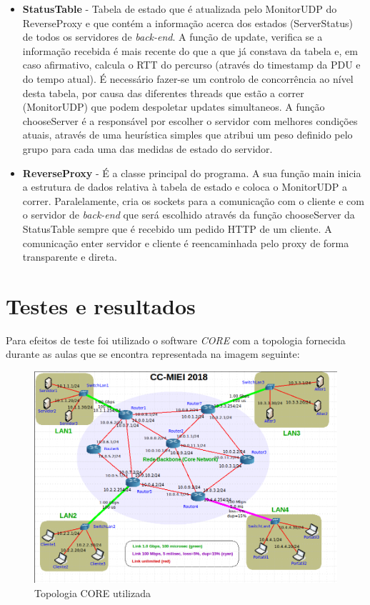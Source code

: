 \documentclass{article}
\begin{document}
\begin{itemize}
    \item \textbf{StatusTable} - Tabela de estado que é atualizada pelo MonitorUDP do ReverseProxy e que contém a informação acerca dos estados (ServerStatus) de todos os servidores de \emph{back-end}. A função de update, verifica se a informação recebida é mais recente do que a que já constava da tabela e, em caso afirmativo, calcula o RTT do percurso (através do timestamp da PDU e do tempo atual). É necessário fazer-se um controlo de concorrência ao nível desta tabela, por causa das diferentes threads que estão a correr (MonitorUDP) que podem despoletar updates simultaneos. A função chooseServer é a responsável por escolher o servidor com melhores condições atuais, através de uma heurística simples que atribui um peso definido pelo grupo para cada uma das medidas de estado do servidor.
    \item \textbf{ReverseProxy} - É a classe principal do programa. A sua função main inicia a estrutura de dados relativa à tabela de estado e coloca o MonitorUDP a correr. Paralelamente, cria os sockets para a comunicação com o cliente e com o servidor de \emph{back-end} que será escolhido através da função chooseServer da StatusTable sempre que é recebido um pedido HTTP de um cliente. A comunicação enter servidor e cliente é reencaminhada pelo proxy de forma transparente e direta.
\end{itemize}

\newpage
\section{Testes e resultados}

Para efeitos de teste foi utilizado o software \emph{CORE} com a topologia fornecida durante as aulas que se encontra representada na imagem seguinte:

\begin{figure}[H]
    \centering
    \includegraphics[scale=0.3]{img/topologia.png}
    \caption{Topologia CORE utilizada}
\end{figure}
\end{document}

